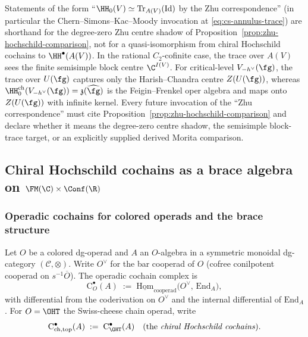 \begin{remark}%
\label{rem:zhu-folklore-recode}%
Statements of the form ``$\HH_0(V)\simeq \mathrm{Tr}_{A(V)}(\mathrm{Id})$
by the Zhu correspondence'' (in particular the Chern--Simons--Kac--Moody
invocation at \eqref{eq:cs-annulus-trace}) are shorthand for
the degree-zero Zhu centre shadow of
Proposition~\ref{prop:zhu-hochschild-comparison}, not for a
quasi-isomorphism from chiral Hochschild cochains to
\(\HH^\bullet(A(V))\).  In the rational \(C_2\)-cofinite case, the
trace over \(A(V)\) sees the finite semisimple block centre
\(\C^{I(V)}\). For critical-level \(V_{-h^\vee}(\fg)\), the trace over
\(U(\fg)\) captures only the Harish--Chandra centre \(Z(U(\fg))\),
whereas
\(\HH^{\mathrm{ch}}_0(V_{-h^\vee}(\fg))=\mathfrak{z}(\widehat{\fg})\)
is the Feigin--Frenkel oper algebra and maps onto \(Z(U(\fg))\) with
infinite kernel. Every future invocation of the ``Zhu correspondence''
must cite Proposition~\ref{prop:zhu-hochschild-comparison} and declare
whether it means the degree-zero centre shadow, the semisimple
block-trace target, or an explicitly supplied derived Morita
comparison.
\end{remark}

\subsection{\texorpdfstring{Chiral Hochschild cochains as a brace algebra on $\FM(\C)\times\Conf(\R)$}{Chiral Hochschild cochains as a brace algebra on FM(C) x Conf(R)}}
\label{sec:chiral-Hochschild}

\subsubsection{Operadic cochains for colored operads and the brace structure}
\label{subsec:operadic-cochains}
Let $O$ be a colored dg-operad and $A$ an $O$-algebra in a symmetric monoidal dg-category $(\mathcal C,\otimes)$.
Write $O^\vee$ for the bar cooperad of $O$ (cofree conilpotent cooperad on $s^{-1}\overline O$).
The operadic cochain complex is
\[
\mathrm{C}^\bullet_O(A) \;:=\; \underline{\mathrm{Hom}}_{\text{cooperad}} \bigl( O^\vee,\, \mathrm{End}_A \bigr),
\]
with differential from the coderivation on $O^\vee$ and the internal differential of $\mathrm{End}_A$.
For $O = \OHT$ the Swiss-cheese chain operad, write
\[
\mathrm{C}^\bullet_{\mathrm{ch,top}}(A)\;:=\;\mathrm{C}^\bullet_{\OHT}(A)
\quad\text{(the \emph{chiral Hochschild cochains})}.
\]

